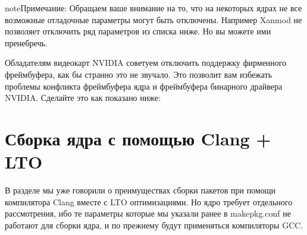\documentclass[letterpaper,10pt,russian,openany]{sphinxmanual}
\begin{document}
\begin{sphinxadmonition}{note}{Примечание:}
\sphinxAtStartPar
Обращаем ваше внимание на то, что на некоторых ядрах не все возможные отладочные параметры могут быть отключены.
Например Xanmod не позволяет отключить ряд параметров из списка ниже. Но вы можете ими пренебречь.
\end{sphinxadmonition}

\sphinxAtStartPar
{}

\noindent{}

\sphinxAtStartPar
{}

\noindent{}

\sphinxAtStartPar
{} Обладателям видеокарт NVIDIA советуем отключить поддержку фирменного фреймбуфера, как бы странно это не звучало.
Это позволит вам избежать проблемы конфликта фреймбуфера ядра и фреймбуфера бинарного драйвера NVIDIA. Сделайте это
как показано ниже:

\sphinxAtStartPar
{}

\noindent{}

\sphinxAtStartPar
{}

\noindent{}

\sphinxAtStartPar
{}

\noindent{}

\sphinxAtStartPar
{}

\noindent{}

\sphinxAtStartPar
{}

\noindent{}

\ignorespaces 

\section{Сборка ядра с помощью Clang + LTO}
\label{\detokenize{source/custom-kernels:clang-lto}}\label{\detokenize{source/custom-kernels:kernel-with-clang-lto}}\label{\detokenize{source/custom-kernels:index-7}}
\sphinxAtStartPar
В разделе 
мы уже говорили о преимуществах сборки пакетов при помощи компилятора Clang вместе с LTO оптимизациями.
Но ядро требует отдельного рассмотрения, ибо те параметры которые мы указали ранее в makepkg.conf не работают для сборки ядра,
и по прежнему будут применяться компиляторы GCC.
\end{document}
